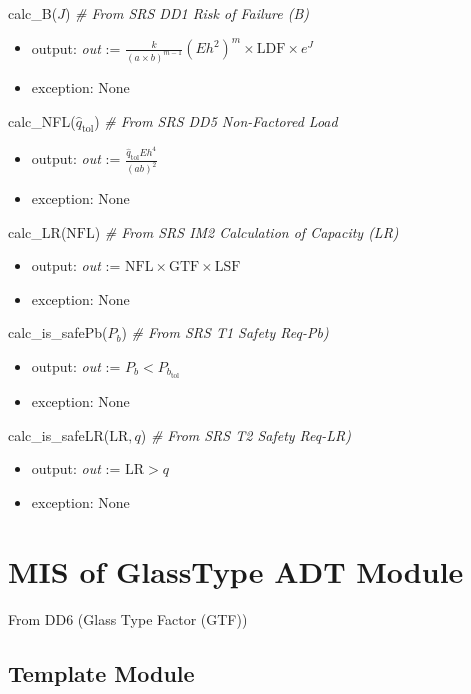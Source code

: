 \documentclass[12pt, titlepage]{article}
\begin{document}
\noindent calc\_B($J$) \textit{\# From SRS DD1 Risk of Failure (B)}
\begin{itemize}
\item output:  \textit{out} := $\frac{k}{(a \times b)^{m-1}}(E h^2)^m 
					\times \text{LDF} \times e^J$
\item exception: None
\end{itemize}

\noindent calc\_NFL($\hat{q}_\text{tol}$) \textit{\# From SRS DD5 Non-Factored Load}
\begin{itemize}
\item output:  \textit{out} := $\frac{\hat{q}_{\text{tol}}Eh^4}{(ab)^2}$
\item exception: None
\end{itemize}

\noindent calc\_LR($\text{NFL}$) \textit{\# From SRS IM2 Calculation of Capacity (LR)}
\begin{itemize}
\item output:  \textit{out} := $\text{NFL} \times \text{GTF} \times \text{LSF}$
\item exception: None
\end{itemize}

\noindent calc\_is\_safePb($P_b$) \textit{\# From SRS T1 Safety Req-Pb)}
\begin{itemize}
\item output:  \textit{out} := $P_b < P_{b_{\text{tol}}}$
\item exception: None
\end{itemize}

\noindent calc\_is\_safeLR($\text{LR}, q$) \textit{\# From SRS T2 Safety Req-LR)}
\begin{itemize}
\item output:  \textit{out} := $\text{LR} > q$
\item exception: None
\end{itemize}

\newpage


\section {MIS of GlassType ADT Module} \label{GlassTypeADT}

From DD6 (Glass Type Factor (GTF)) %

\subsection{Template Module}
\end{document}
